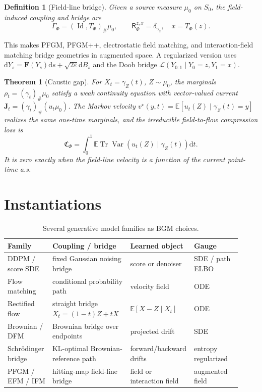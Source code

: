 \documentclass{article}
\newtheorem{definition}{Definition}
\newtheorem{theorem}{Theorem}
\numberwithin{equation}{section}
\newcommand{\E}{\mathbb{E}}
\newcommand{\dd}{\mathrm{d}}
\newcommand{\Law}{\mathcal{L}}
\newcommand{\scrR}{\mathsf{R}}
\newcommand{\eps}{\varepsilon}
\newcommand{\F}{\bm F}
\newcommand{\J}{\bm J}
\newcommand{\Var}{\operatorname{Var}}
\newcommand{\Tr}{\operatorname{Tr}}
\newcommand{\Id}{\operatorname{Id}}
\begin{document}
\begin{definition}[Field-line bridge]
Given a source measure $\mu_0$ on $S_0$, the field-induced coupling and bridge are
\begin{equation}
    \Gamma_\Phi=(\Id,T_\Phi)_\#\mu_0,
    \qquad
    \scrR^{z,x}_{\Phi}=\delta_{\gamma_z},\quad x=T_\Phi(z).
    \label{eq:field_bridge}
\end{equation}
\end{definition}

This makes PFGM, PFGM++, electrostatic field matching, and interaction-field matching bridge geometries in augmented space. A regularized version uses $\dd Y_s=\F(Y_s)\dd s+\sqrt{2\eps}\dd B_s$ and the Doob bridge $\Law(Y_{0:1}\mid Y_0=z,Y_1=x)$.

\begin{theorem}[Caustic gap]
\label{thm:caustic}
For $X_t=\gamma_Z(t)$, $Z\sim\mu_0$, the marginals $\rho_t=(\gamma_t)_\#\mu_0$ satisfy a weak continuity equation with vector-valued current $\J_t=(\gamma_t)_\#(u_t\mu_0)$. The Markov velocity $v^\star(y,t)=\E[u_t(Z)\mid\gamma_Z(t)=y]$ realizes the same one-time marginals, and the irreducible field-to-flow compression loss is
\begin{equation}
    \mathfrak C_\Phi=\int_0^1\E\Tr\Var(u_t(Z)\mid\gamma_Z(t))\dd t.
\end{equation}
It is zero exactly when the field-line velocity is a function of the current point-time a.s.
\end{theorem}

\section{Instantiations}
\label{sec:instances}

\begin{table}[t]
\centering
\small
\caption{Several generative model families as BGM choices.}
\label{tab:instances}
\begin{tabular}{@{}p{0.19\linewidth}p{0.33\linewidth}p{0.20\linewidth}p{0.20\linewidth}@{}}
\toprule
Family & Coupling / bridge & Learned object & Gauge \\
\midrule
DDPM / score SDE & fixed Gaussian noising bridge & score or denoiser & SDE / path ELBO \\
Flow matching & conditional probability path & velocity field & ODE \\
Rectified flow & straight bridge $X_t=(1-t)Z+tX$ & $\E[X-Z\mid X_t]$ & ODE \\
Brownian / DFM & Brownian bridge over endpoints & projected drift & SDE \\
Schr\"odinger bridge & KL-optimal Brownian-reference path & forward/backward drifts & entropy regularized \\
PFGM / EFM / IFM & hitting-map field-line bridge & field or interaction field & augmented field \\
\bottomrule
\end{tabular}
\end{table}
\end{document}
